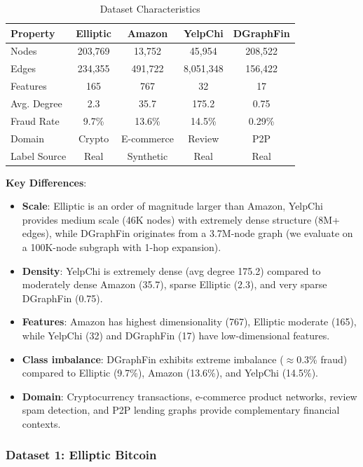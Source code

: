 \begin{table}[t]
\centering
\caption{Dataset Characteristics}
\label{tab:datasets}
\small
\begin{tabular}{lcccc}
\toprule
\textbf{Property} & \textbf{Elliptic} & \textbf{Amazon} & \textbf{YelpChi} & \textbf{DGraphFin} \\
\midrule
Nodes & 203,769 & 13,752 & 45,954 & 208,522 \\
Edges & 234,355 & 491,722 & 8,051,348 & 156,422 \\
Features & 165 & 767 & 32 & 17 \\
Avg. Degree & 2.3 & 35.7 & 175.2 & 0.75 \\
Fraud Rate & 9.7\% & 13.6\% & 14.5\% & 0.29\% \\
Domain & Crypto & E-commerce & Review & P2P \\
Label Source & Real & Synthetic & Real & Real \\
\bottomrule
\end{tabular}
\end{table}

\textbf{Key Differences}:
\begin{itemize}
\item \textbf{Scale}: Elliptic is an order of magnitude larger than Amazon, YelpChi provides medium scale (46K nodes) with extremely dense structure (8M+ edges), while DGraphFin originates from a 3.7M-node graph (we evaluate on a 100K-node subgraph with 1-hop expansion).
\item \textbf{Density}: YelpChi is extremely dense (avg degree 175.2) compared to moderately dense Amazon (35.7), sparse Elliptic (2.3), and very sparse DGraphFin (0.75).
\item \textbf{Features}: Amazon has highest dimensionality (767), Elliptic moderate (165), while YelpChi (32) and DGraphFin (17) have low-dimensional features.
\item \textbf{Class imbalance}: DGraphFin exhibits extreme imbalance ($\approx$0.3\% fraud) compared to Elliptic (9.7\%), Amazon (13.6\%), and YelpChi (14.5\%).
\item \textbf{Domain}: Cryptocurrency transactions, e-commerce product networks, review spam detection, and P2P lending graphs provide complementary financial contexts.
\end{itemize}

\subsubsection{Dataset 1: Elliptic Bitcoin}

